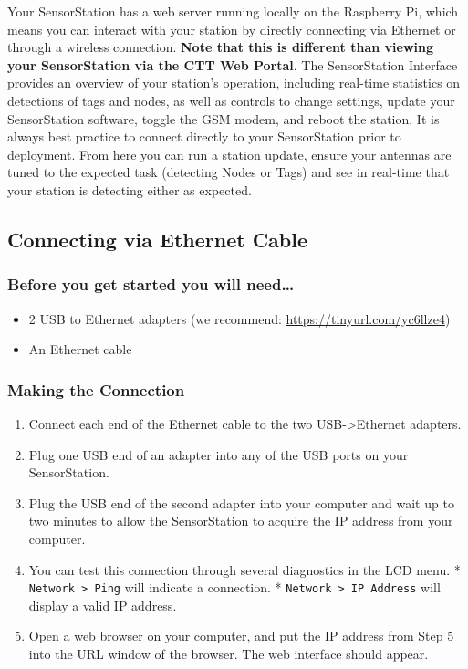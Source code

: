 \documentclass[
]{article}
\providecommand{\tightlist}{%
  \setlength{\itemsep}{0pt}\setlength{\parskip}{0pt}}
\begin{document}
Your SensorStation has a web server running locally on the Raspberry Pi,
which means you can interact with your station by directly connecting
via Ethernet or through a wireless connection. \textbf{Note that this is
different than viewing your SensorStation via the CTT Web Portal}. The
SensorStation Interface provides an overview of your station's
operation, including real-time statistics on detections of tags and
nodes, as well as controls to change settings, update your SensorStation
software, toggle the GSM modem, and reboot the station. It is always
best practice to connect directly to your SensorStation prior to
deployment. From here you can run a station update, ensure your antennas
are tuned to the expected task (detecting Nodes or Tags) and see in
real-time that your station is detecting either as expected.

\hypertarget{connecting-via-ethernet-cable}{%
\subsection{Connecting via Ethernet
Cable}\label{connecting-via-ethernet-cable}}

\hypertarget{before-you-get-started-you-will-need}{%
\subsubsection{Before you get started you will
need\ldots{}}\label{before-you-get-started-you-will-need}}

\begin{itemize}
\tightlist
\item
  2 USB to Ethernet adapters (we recommend:
  \url{https://tinyurl.com/yc6llze4})
\item
  An Ethernet cable
\end{itemize}

\hypertarget{making-the-connection}{%
\subsubsection{Making the Connection}\label{making-the-connection}}

\begin{enumerate}
\def\labelenumi{\arabic{enumi}.}
\tightlist
\item
  Connect each end of the Ethernet cable to the two
  USB-\textgreater Ethernet adapters.
\item
  Plug one USB end of an adapter into any of the USB ports on your
  SensorStation.
\item
  Plug the USB end of the second adapter into your computer and wait up
  to two minutes to allow the SensorStation to acquire the IP address
  from your computer.
\item
  You can test this connection through several diagnostics in the LCD
  menu. * \texttt{Network\ \textgreater{}\ Ping} will indicate a
  connection. * \texttt{Network\ \textgreater{}\ IP\ Address} will
  display a valid IP address.
\item
  Open a web browser on your computer, and put the IP address from Step
  5 into the URL window of the browser. The web interface should appear.
\end{enumerate}
\end{document}
